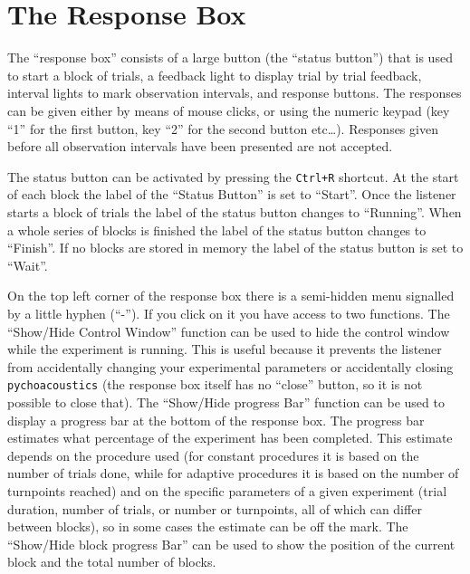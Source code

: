 \section{The Response Box}

The ``response box'' consists of a large button (the ``status button'') that is used to start a block of trials, a feedback light to display trial by trial feedback, interval lights to mark observation intervals, and response buttons. The responses can be given either by means of mouse clicks, or using the numeric keypad (key ``1'' for the first button, key ``2'' for the second button etc\ldots). Responses given before all observation intervals have been presented are not accepted. 

The status button can be activated  by pressing the \texttt{Ctrl+R} shortcut.  At the start of each block the label of the ``Status Button'' is set to ``Start''. Once the listener starts a block of trials the label of the status button changes to ``Running''. When a whole series of blocks is finished the label of the status button changes to ``Finish''. If no blocks are stored in memory the label of the status button is set to ``Wait''.

On the top left corner of the response box there is a semi-hidden menu signalled by a little hyphen (``-''). If you click on it you have access to two functions. The ``Show/Hide Control Window'' function can be used to hide the control window while the experiment is running. This is useful because it prevents the listener from accidentally changing your experimental parameters or accidentally closing \texttt{pychoacoustics} (the response box itself has no ``close'' button, so it is not possible to close that). The ``Show/Hide progress Bar'' function can be used to display a progress bar at the bottom of the response box. The progress bar estimates what percentage of the experiment has been completed. This estimate depends on the procedure used (for constant procedures it is based on the number of trials done, while for adaptive procedures it is based on the number of turnpoints reached) and on the specific parameters of a given experiment (trial duration, number of trials, or number or turnpoints, all of which can differ between blocks), so in some cases the estimate can be off the mark. The ``Show/Hide block progress Bar'' can be used to show the position of the current block and the total number of blocks. 





